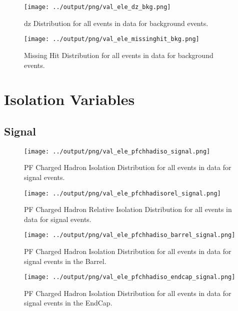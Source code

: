 \documentclass[11pt]{book}
\begin{document}
\begin{figure}[htb]
\centering
\texttt{[image: ../output/png/val\_ele\_dz\_bkg.png]}
\caption{dz Distribution for all events in data for background events.}
\label{fig:val_ele_dz_bkg}
\end{figure}

\begin{figure}[htb]
\centering
\texttt{[image: ../output/png/val\_ele\_missinghit\_bkg.png]}
\caption{Missing Hit Distribution for all events in data for background events.}
\label{fig:val_ele_missinghit_bkg}
\end{figure}
\clearpage


\chapter{Isolation Variables}

\section{Signal}
\begin{figure}[htb]
\centering
\texttt{[image: ../output/png/val\_ele\_pfchhadiso\_signal.png]}
\caption{PF Charged Hadron Isolation Distribution for all events in data for signal events.}
\label{fig:val_ele_pfchhadiso_signal}
\end{figure}

\begin{figure}[htb]
\centering
\texttt{[image: ../output/png/val\_ele\_pfchhadisorel\_signal.png]}
\caption{PF Charged Hadron Relative Isolation Distribution for all events in data for signal events.}
\label{fig:val_ele_pfchhadisorel_signal}
\end{figure}

\begin{figure}[htb]
\centering
\texttt{[image: ../output/png/val\_ele\_pfchhadiso\_barrel\_signal.png]}
\caption{PF Charged Hadron Isolation Distribution for all events in data for signal events in the Barrel.}
\label{fig:val_ele_pfchhadiso_barrel_signal}
\end{figure}

\begin{figure}[htb]
\centering
\texttt{[image: ../output/png/val\_ele\_pfchhadiso\_endcap\_signal.png]}
\caption{PF Charged Hadron Isolation Distribution for all events in data for signal events in the EndCap.}
\label{fig:val_ele_pfchhadiso_endcap_signal}
\end{figure}
\end{document}
